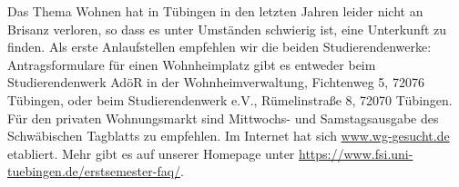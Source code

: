     Das Thema Wohnen hat in Tübingen in den letzten Jahren leider nicht an Brisanz verloren, so dass
    es unter Umständen schwierig ist, eine Unterkunft zu finden. Als erste Anlaufstellen empfehlen wir
    die beiden Studierendenwerke: Antragsformulare für einen Wohnheimplatz gibt es entweder beim
    Studierendenwerk AdöR in der Wohnheimverwaltung, Fichtenweg 5, 72076 Tübingen, oder beim Studierendenwerk
    e.V., Rümelinstraße 8, 72070 Tübingen. Für den privaten Wohnungsmarkt sind Mittwochs- und Samstagsausgabe
    des Schwäbischen Tagblatts zu empfehlen.
    Im Internet hat sich \url{www.wg-gesucht.de} etabliert. Mehr gibt es auf unserer Homepage unter \url{https://www.fsi.uni-tuebingen.de/erstsemester-faq/}.
    \fi
